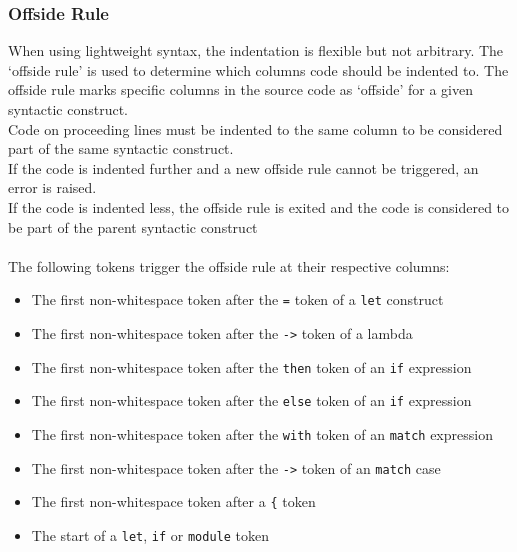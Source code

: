 \documentclass{article}
\begin{document}
\subsubsection{Offside Rule}
When using lightweight syntax, the indentation is flexible but not arbitrary. The `offside rule' is used to determine which columns code should be indented to. The offside rule marks specific columns in the source code as `offside' for a given syntactic construct.\\
Code on proceeding lines must be indented to the same column to be considered part of the same syntactic construct.\\
If the code is indented further and a new offside rule cannot be triggered, an error is raised.\\
If the code is indented less, the offside rule is exited and the code is considered to be part of the parent syntactic construct\\
\\
The following tokens trigger the offside rule at their respective columns:\\
\begin{itemize}
    \item{The first non-whitespace token after the \verb|=| token of a \verb|let| construct}
    \item{The first non-whitespace token after the \verb|->| token of a lambda}
    \item{The first non-whitespace token after the \verb|then| token of an \verb|if| expression}
    \item{The first non-whitespace token after the \verb|else| token of an \verb|if| expression}
    \item{The first non-whitespace token after the \verb|with| token of an \verb|match| expression}
    \item{The first non-whitespace token after the \verb|->| token of an \verb|match| case}
    \item{The first non-whitespace token after a \verb|{| token}
    \item{The start of a \verb|let|, \verb|if| or \verb|module| token}
\end{itemize}
\end{document}
